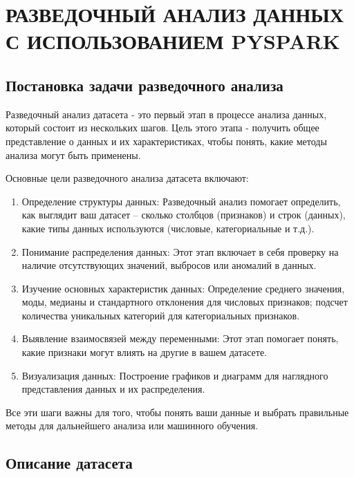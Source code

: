 %
\chapter{\MakeUppercase{Разведочный анализ данных с использованием PySpark}}\label{ch:first}
\section{Постановка задачи разведочного анализа}\vspace{\baselineskip}

Разведочный анализ датасета - это первый этап в процессе анализа данных, который состоит из нескольких шагов. Цель этого этапа - получить общее представление о данных и их характеристиках, чтобы понять, какие методы анализа могут быть применены.

Основные цели разведочного анализа датасета включают:
\begin{enumerate}
\item Определение структуры данных: Разведочный анализ помогает определить, как выглядит ваш датасет – сколько столбцов (признаков) и строк (данных), какие типы данных используются (числовые, категориальные и т.д.).
\item Понимание распределения данных: Этот этап включает в себя проверку на наличие отсутствующих значений, выбросов или аномалий в данных.
\item Изучение основных характеристик данных: Определение среднего значения, моды, медианы и стандартного отклонения для числовых признаков; подсчет количества уникальных категорий для категориальных признаков.
\item Выявление взаимосвязей между переменными: Этот этап помогает понять, какие признаки могут влиять на другие в вашем датасете.
\item Визуализация данных: Построение графиков и диаграмм для наглядного представления данных и их распределения.
\end{enumerate}
Все эти шаги важны для того, чтобы понять ваши данные и выбрать правильные методы для дальнейшего анализа или машинного обучения.


\vspace{\baselineskip}\section{Описание датасета}\vspace{\baselineskip}


